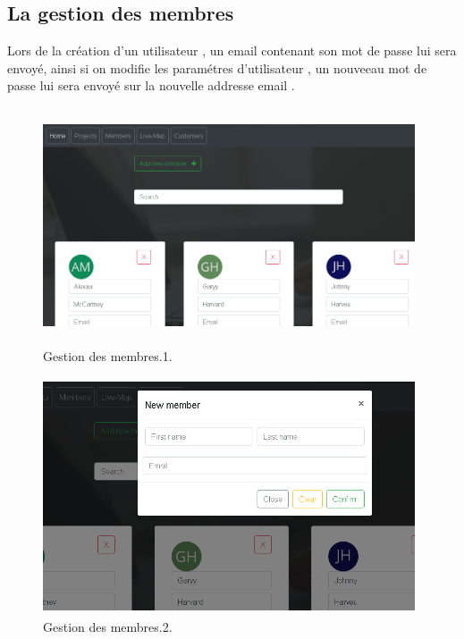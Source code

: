 \newpage
\subsection{La gestion des membres}
Lors de la cr\'{e}ation d'un utilisateur , un email contenant son mot de passe lui
sera envoy\'{e}, ainsi si on modifie les param\'{e}tres d'utilisateur , un nouveeau
mot de passe lui sera envoy\'{e} sur la nouvelle addresse email .

\FloatBarrier
\begin{figure}[H]
\center
\includegraphics[width=11cm,height=7cm]{./figures/pres/mm1.png}
\caption{Gestion des membres.1.}
\end{figure}
\FloatBarrier



\FloatBarrier
\begin{figure}[H]
\center
\includegraphics[width=11cm,height=7cm]{./figures/pres/mm2.png}
\caption{Gestion des membres.2.}
\end{figure}
\FloatBarrier


